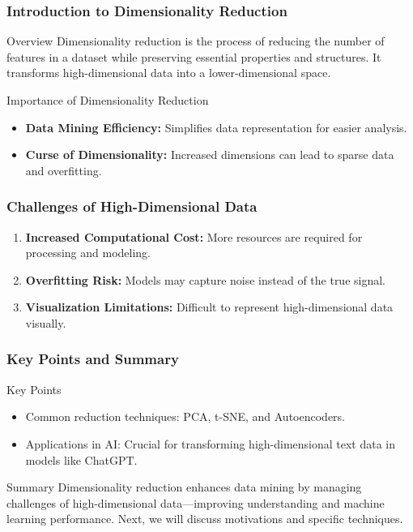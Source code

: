 \documentclass[aspectratio=169]{beamer}
\begin{document}
\frame{\titlepage}

\begin{frame}[fragile]
    \frametitle{Introduction to Dimensionality Reduction}
    
    \begin{block}{Overview}
        Dimensionality reduction is the process of reducing the number of features in a dataset while preserving essential properties and structures. It transforms high-dimensional data into a lower-dimensional space.
    \end{block}
    
    \begin{block}{Importance of Dimensionality Reduction}
        \begin{itemize}
            \item \textbf{Data Mining Efficiency:} Simplifies data representation for easier analysis.
            \item \textbf{Curse of Dimensionality:} Increased dimensions can lead to sparse data and overfitting.
        \end{itemize}
    \end{block}
    
\end{frame}

\begin{frame}[fragile]
    \frametitle{Challenges of High-Dimensional Data}
    
    \begin{enumerate}
        \item \textbf{Increased Computational Cost:} More resources are required for processing and modeling.
        \item \textbf{Overfitting Risk:} Models may capture noise instead of the true signal.
        \item \textbf{Visualization Limitations:} Difficult to represent high-dimensional data visually.
    \end{enumerate}
    
\end{frame}

\begin{frame}[fragile]
    \frametitle{Key Points and Summary}
    
    \begin{block}{Key Points}
        \begin{itemize}
            \item Common reduction techniques: PCA, t-SNE, and Autoencoders.
            \item Applications in AI: Crucial for transforming high-dimensional text data in models like ChatGPT.
        \end{itemize}
    \end{block}
    
    \begin{block}{Summary}
        Dimensionality reduction enhances data mining by managing challenges of high-dimensional data—improving understanding and machine learning performance. Next, we will discuss motivations and specific techniques.
    \end{block}
    
\end{frame}
\end{document}
